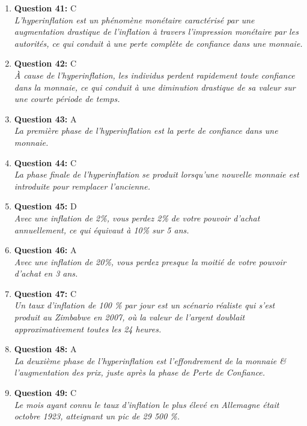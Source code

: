 \documentclass[12pt,a4paper]{article}
\begin{document}
\begin{enumerate}
\item \textbf{Question 41:} C
\\ \textit{L'hyperinflation est un phénomène monétaire caractérisé par une augmentation drastique de l'inflation à travers l'impression monétaire par les autorités, ce qui conduit à une perte complète de confiance dans une monnaie.}

\item \textbf{Question 42:} C
\\ \textit{À cause de l'hyperinflation, les individus perdent rapidement toute confiance dans la monnaie, ce qui conduit à une diminution drastique de sa valeur sur une courte période de temps.}

\item \textbf{Question 43:} A
\\ \textit{La première phase de l'hyperinflation est la perte de confiance dans une monnaie.}

\item \textbf{Question 44:} C
\\ \textit{La phase finale de l'hyperinflation se produit lorsqu'une nouvelle monnaie est introduite pour remplacer l'ancienne.}

\item \textbf{Question 45:} D
\\ \textit{Avec une inflation de 2\%, vous perdez 2\% de votre pouvoir d'achat annuellement, ce qui équivaut à 10\% sur 5 ans.}

\item \textbf{Question 46:} A
\\ \textit{Avec une inflation de 20\%, vous perdez presque la moitié de votre pouvoir d'achat en 3 ans.}

\item \textbf{Question 47:} C
\\ \textit{Un taux d'inflation de 100 \% par jour est un scénario réaliste qui s'est produit au Zimbabwe en 2007, où la valeur de l'argent doublait approximativement toutes les 24 heures.}

\item \textbf{Question 48:} A
\\ \textit{La deuxième phase de l'hyperinflation est l'effondrement de la monnaie & l'augmentation des prix, juste après la phase de Perte de Confiance.}

\item \textbf{Question 49:} C
\\ \textit{Le mois ayant connu le taux d'inflation le plus élevé en Allemagne était octobre 1923, atteignant un pic de 29 500 \%.}


\end{enumerate}
\end{document}
